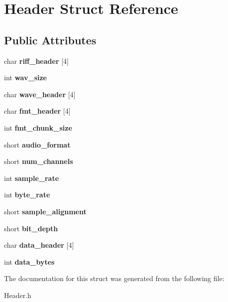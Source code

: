 \hypertarget{structHeader}{}\section{Header Struct Reference}
\label{structHeader}
\subsection*{Public Attributes}
\begin{DoxyCompactItemize}
\item 
\mbox{\label{structHeader_aef6366af02e298c8e227d9a2a0b3fc8d}} 
char {\bfseries riff\+\_\+header} \mbox{[}4\mbox{]}
\item 
\mbox{\label{structHeader_a1c734a1ce3dccb290cf7279f7351858c}} 
int {\bfseries wav\+\_\+size}
\item 
\mbox{\label{structHeader_aa743412c36365fe04501af3e177781d0}} 
char {\bfseries wave\+\_\+header} \mbox{[}4\mbox{]}
\item 
\mbox{\label{structHeader_aebc921235da9fbd8f434ba88920b2668}} 
char {\bfseries fmt\+\_\+header} \mbox{[}4\mbox{]}
\item 
\mbox{\label{structHeader_aa9a82fbc0bf7a19db90c075a960c22e9}} 
int {\bfseries fmt\+\_\+chunk\+\_\+size}
\item 
\mbox{\label{structHeader_ab0cfd2c0f46b04ac132b0e3968066059}} 
short {\bfseries audio\+\_\+format}
\item 
\mbox{\label{structHeader_a53f110177f0b2716869e5efb3a4734bc}} 
short {\bfseries num\+\_\+channels}
\item 
\mbox{\label{structHeader_ad2e6df1fa88084f03b266973f3eda1d1}} 
int {\bfseries sample\+\_\+rate}
\item 
\mbox{\label{structHeader_ac69f8a1941834116b2041b698ec8b951}} 
int {\bfseries byte\+\_\+rate}
\item 
\mbox{\label{structHeader_ad5eb1f6f72ae7dd469cc010e94e84bde}} 
short {\bfseries sample\+\_\+alignment}
\item 
\mbox{\label{structHeader_afeedd35a99af73d38ca04690e541e975}} 
short {\bfseries bit\+\_\+depth}
\item 
\mbox{\label{structHeader_a2ef7b52e8d92199ebaa11ebee3aaa58d}} 
char {\bfseries data\+\_\+header} \mbox{[}4\mbox{]}
\item 
\mbox{\label{structHeader_a39dc561ae37a9f7578addbe8530986c9}} 
int {\bfseries data\+\_\+bytes}
\end{DoxyCompactItemize}


The documentation for this struct was generated from the following file\+:\begin{DoxyCompactItemize}
\item 
Header.\+h\end{DoxyCompactItemize}
